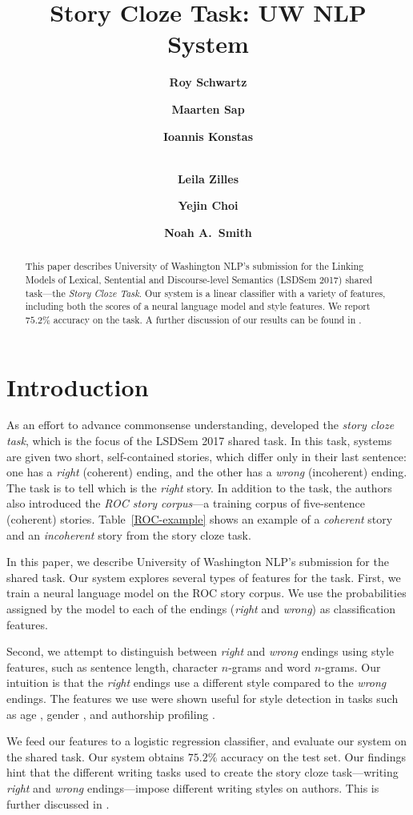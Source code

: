 \documentclass[a4paper,11pt]{article}
\title{Story Cloze Task: UW NLP System}
\author[1,2]{\bf Roy Schwartz}
\author[1]{\bf Maarten Sap}
\author[1]{\bf Ioannis Konstas}
\author[1]{\\ \bf Leila Zilles}
\author[1]{\bf Yejin Choi}
\author[1]{\bf Noah A.~Smith}
\affil[1]{Computer Science \& Engineering, University of Washington, Seattle, WA 98195, USA}
\affil[2]{Allen Institute for Artificial Intelligence, Seattle, WA 98103, USA}
\affil[  ]{\tt \{roysch,msap,ikonstas,lzilles,yejin,nasmith\}@cs.washington.edu}
\date{}
\newcommand{\tabref}[1]{Table~\ref{#1}}
\begin{document}
\maketitle
\begin{abstract} 
This paper describes University of Washington NLP's submission for the Linking Models of Lexical, Sentential and Discourse-level Semantics (LSDSem 2017) shared task---the \textit{Story Cloze Task}.
Our system is a linear classifier with a variety of features, including both the scores of a neural language model and style features.
We report  $75.2\%$ accuracy on the task. 
A further discussion of our results can be found in .
\end{abstract}

\section{Introduction}
As an effort to advance commonsense  understanding,  developed the \textit{story cloze task}, which is the focus of the LSDSem 2017 shared task. 
In this task, systems are given two short, self-contained stories, which differ only in their last sentence: 
one has a {\it right} (coherent) ending, and the other has a {\it wrong} (incoherent) ending.
The task is to tell which is the {\it right} story.
In addition to the task, the authors also introduced the {\it ROC story corpus}---a training corpus of five-sentence (coherent) stories. 
\tabref{ROC-example} shows an example of a {\it coherent} story and an {\it incoherent} story from the story cloze task.


In this paper, we describe University of Washington NLP's submission for the shared task.
Our system explores several types of features for the task.
First, we train a neural language model \cite{mikolov2010recurrent} on the ROC story corpus. 
We use the probabilities assigned by the model to each of the endings ({\it right} and {\it wrong}) as classification features.

Second, we attempt to distinguish between {\it right} and {\it wrong} endings using style features, such as sentence length, character $n$-grams and word $n$-grams. 
Our intuition is that the {\it right} endings use a different style compared to the {\it wrong} endings.
The features we use were shown useful for style detection in tasks such as age \cite{Schler:2006}, gender \cite{Argamon:2003}, 
and authorship profiling \cite{Stamatatos:2009}.

We feed our features to  a logistic regression classifier, and evaluate our system on the shared task.
Our system obtains $75.2\%$ accuracy on the test set.
Our findings hint that the different writing tasks used to create the story cloze task---writing {\it right} and {\it wrong} endings---impose different writing styles on authors. 
This is further discussed in .
\end{document}
